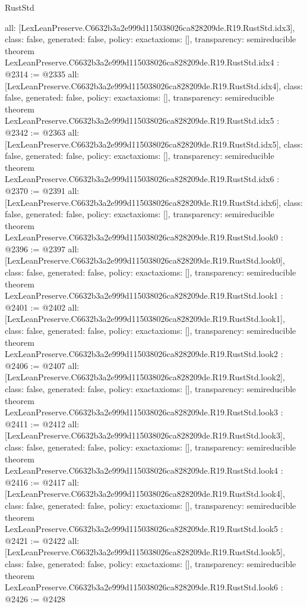 \begin{lexlean}{RustStd}
\begin{coremodule}
{  all: [LexLeanPreserve.C6632b3a2e999d115038026ca828209de.R19.RustStd.idx3],
  class: false,
  generated: false,
  policy: exact{axioms: []},
  transparency: semireducible
}
theorem LexLeanPreserve.C6632b3a2e999d115038026ca828209de.R19.RustStd.idx4 : @2314 := @2335 {
  all: [LexLeanPreserve.C6632b3a2e999d115038026ca828209de.R19.RustStd.idx4],
  class: false,
  generated: false,
  policy: exact{axioms: []},
  transparency: semireducible
}
theorem LexLeanPreserve.C6632b3a2e999d115038026ca828209de.R19.RustStd.idx5 : @2342 := @2363 {
  all: [LexLeanPreserve.C6632b3a2e999d115038026ca828209de.R19.RustStd.idx5],
  class: false,
  generated: false,
  policy: exact{axioms: []},
  transparency: semireducible
}
theorem LexLeanPreserve.C6632b3a2e999d115038026ca828209de.R19.RustStd.idx6 : @2370 := @2391 {
  all: [LexLeanPreserve.C6632b3a2e999d115038026ca828209de.R19.RustStd.idx6],
  class: false,
  generated: false,
  policy: exact{axioms: []},
  transparency: semireducible
}
theorem LexLeanPreserve.C6632b3a2e999d115038026ca828209de.R19.RustStd.look0 : @2396 := @2397 {
  all: [LexLeanPreserve.C6632b3a2e999d115038026ca828209de.R19.RustStd.look0],
  class: false,
  generated: false,
  policy: exact{axioms: []},
  transparency: semireducible
}
theorem LexLeanPreserve.C6632b3a2e999d115038026ca828209de.R19.RustStd.look1 : @2401 := @2402 {
  all: [LexLeanPreserve.C6632b3a2e999d115038026ca828209de.R19.RustStd.look1],
  class: false,
  generated: false,
  policy: exact{axioms: []},
  transparency: semireducible
}
theorem LexLeanPreserve.C6632b3a2e999d115038026ca828209de.R19.RustStd.look2 : @2406 := @2407 {
  all: [LexLeanPreserve.C6632b3a2e999d115038026ca828209de.R19.RustStd.look2],
  class: false,
  generated: false,
  policy: exact{axioms: []},
  transparency: semireducible
}
theorem LexLeanPreserve.C6632b3a2e999d115038026ca828209de.R19.RustStd.look3 : @2411 := @2412 {
  all: [LexLeanPreserve.C6632b3a2e999d115038026ca828209de.R19.RustStd.look3],
  class: false,
  generated: false,
  policy: exact{axioms: []},
  transparency: semireducible
}
theorem LexLeanPreserve.C6632b3a2e999d115038026ca828209de.R19.RustStd.look4 : @2416 := @2417 {
  all: [LexLeanPreserve.C6632b3a2e999d115038026ca828209de.R19.RustStd.look4],
  class: false,
  generated: false,
  policy: exact{axioms: []},
  transparency: semireducible
}
theorem LexLeanPreserve.C6632b3a2e999d115038026ca828209de.R19.RustStd.look5 : @2421 := @2422 {
  all: [LexLeanPreserve.C6632b3a2e999d115038026ca828209de.R19.RustStd.look5],
  class: false,
  generated: false,
  policy: exact{axioms: []},
  transparency: semireducible
}
theorem LexLeanPreserve.C6632b3a2e999d115038026ca828209de.R19.RustStd.look6 : @2426 := @2428 {
}
\end{coremodule}
\end{lexlean}
